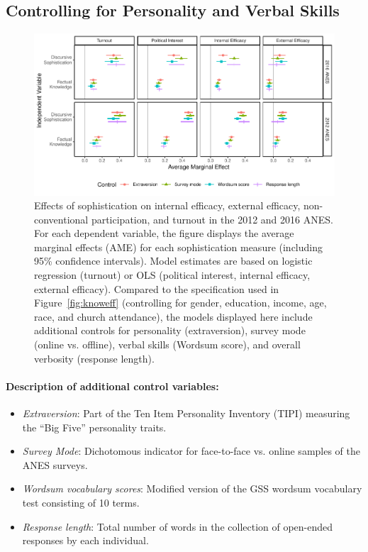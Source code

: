\clearpage
\subsection{Controlling for Personality and Verbal Skills}\label{app:personality}

\begin{figure}[h]\centering
	\includegraphics{../fig/knoweff_robust.pdf}
	\caption{Effects of sophistication on internal efficacy, external efficacy, non-conventional participation, and turnout in the 2012 and 2016 ANES. For each dependent variable, the figure displays the average marginal effects (AME) for each sophistication measure (including 95\% confidence intervals). Model estimates are based on logistic regression (turnout) or OLS (political interest, internal efficacy, external efficacy). Compared to the specification used in Figure~\ref{fig:knoweff} (controlling for gender, education, income, age, race, and church attendance), the models displayed here include additional controls for personality (extraversion), survey mode (online vs. offline), verbal skills (Wordsum score), and overall verbosity (response length).%
	}\label{fig:knoweff_robust}
\end{figure}

\vspace{1em}

\paragraph{Description of additional control variables:}

\begin{itemize}
	\item \textit{Extraversion}: Part of the Ten Item Personality Inventory (TIPI) measuring the ``Big Five'' personality traits.
	\item \textit{Survey Mode}: Dichotomous indicator for face-to-face vs. online samples of the ANES surveys.
	\item \textit{Wordsum vocabulary scores}: Modified version of the GSS wordsum vocabulary test consisting of 10 terms.
	\item \textit{Response length}: Total number of words in the collection of open-ended responses by each individual.
\end{itemize}


